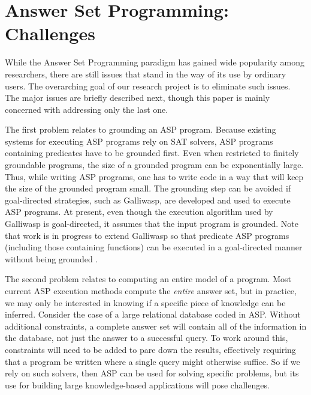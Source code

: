 \documentclass{new_tlp}
\begin{document}
\section{Answer Set Programming: Challenges} \label{sec:challenges}

While the Answer Set Programming paradigm has gained wide popularity among
researchers, there are still issues that stand in the way of its use by
ordinary users. The overarching goal of our research project is to eliminate
such issues. The major issues are briefly described next, though this paper
is mainly concerned with addressing only the last one.

The first problem relates to grounding an ASP program. Because existing 
systems for executing ASP programs rely on SAT solvers, ASP programs containing
predicates have to be grounded first. Even when restricted to finitely
groundable programs, the size of a grounded program can be exponentially large.
Thus, while writing ASP programs, one has to write code in a way that will
keep the size of the grounded program small. The grounding step can be avoided 
if goal-directed strategies, such as Galliwasp, are developed and used to
execute ASP programs. At present, even though the execution algorithm used by
Galliwasp is goal-directed, it assumes that the input program is grounded. Note
that work is in progress to extend Galliwasp so that predicate ASP programs
(including those containing functions) can be executed in a goal-directed
manner without being grounded \cite{elmer}. 

The second problem relates to computing an entire model of a program. Most 
current ASP execution methods compute the {\it entire} answer set, but in 
practice, we may only be interested in knowing if a specific piece of 
knowledge can be inferred. Consider the case of a large relational database 
coded in ASP. Without additional constraints, a complete answer set will 
contain all of the information in the database, not just the answer to a 
successful query. To work around this, constraints will need to be added to 
pare down the results, effectively requiring that a program be written where a 
single query might otherwise suffice. So if we rely on such solvers, then ASP
can be used for solving specific problems, but its use for building large
knowledge-based applications will pose challenges.
\end{document}
